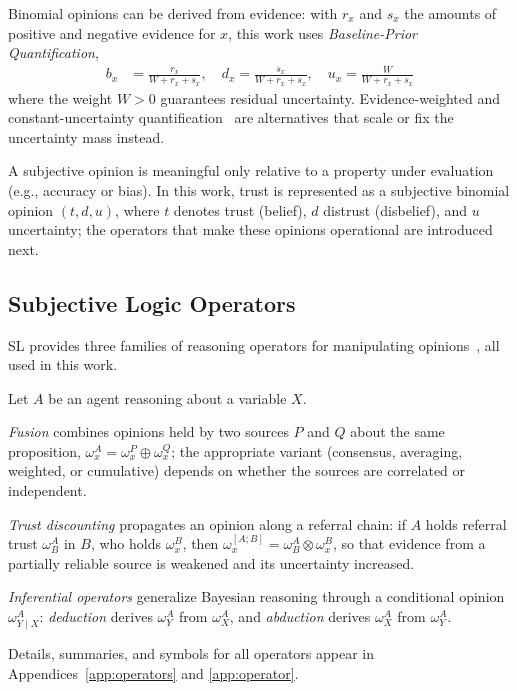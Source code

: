 Binomial opinions can be derived from evidence: with $r_x$ and $s_x$ the amounts of positive and negative evidence for $x$, this work uses \emph{Baseline-Prior Quantification},
\begin{align}
b_x &= \frac{r_x}{W + r_x + s_x}, \quad
d_x = \frac{s_x}{W + r_x + s_x}, \quad
u_x = \frac{W}{W + r_x + s_x}
\label{eq:q1}
\end{align}
where the weight \(W>0\) guarantees residual uncertainty. Evidence-weighted and constant-uncertainty quantification~\cite{10.1007/978-3-032-19096-3_17} are alternatives that scale or fix the uncertainty mass instead.

A subjective opinion is meaningful only relative to a property under evaluation (e.g., accuracy or bias). In this work, trust is represented as a subjective binomial opinion $(t, d, u)$, where $t$ denotes trust (belief), $d$ distrust (disbelief), and $u$ uncertainty; the operators that make these opinions operational are introduced next.

\vspace{-0.5em}
\subsection{Subjective Logic Operators}\label{sec:backslop}

SL provides three families of reasoning operators for manipulating opinions~\cite{8009820,10706345,josang2016subjective}, all used in this work.

\begin{definition}[SL Operators]\label{def:fusion}
Let \(A\) be an agent reasoning about a variable \(X\).

\emph{Fusion} combines opinions held by two sources \(P\) and \(Q\) about the same proposition, \(\omega^A_{x} = \omega^P_{x} \oplus \omega^Q_{x}\); the appropriate variant (consensus, averaging, weighted, or cumulative) depends on whether the sources are correlated or independent.

\emph{Trust discounting} propagates an opinion along a referral chain: if \(A\) holds referral trust \(\omega^A_B\) in \(B\), who holds \(\omega^B_x\), then \(\omega^{[A;B]}_{x} = \omega^A_B \otimes \omega^B_{x}\), so that evidence from a partially reliable source is weakened and its uncertainty increased.

\emph{Inferential operators} generalize Bayesian reasoning through a conditional opinion \(\omega^A_{Y \mid X}\): \emph{deduction} derives \(\omega^A_Y\) from \(\omega^A_X\), and \emph{abduction} derives \(\omega^A_X\) from \(\omega^A_Y\).
\end{definition}
\noindent Details, summaries, and symbols for all operators appear in Appendices~\ref{app:operators} and \ref{app:operator}.

